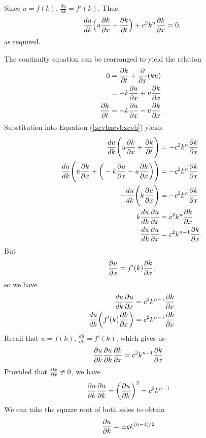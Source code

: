 Since $u=f(k)$, $\frac{du}{dk}=f'(k)$. Thus,
\begin{align*}
  \frac{du}{dk}\Big(u\kx+\kt\Big) + c^2k^n\frac{\partial k}{\partial x} =0,
\end{align*}
as required.
\item The continuity equation can be rearranged to yield the relation
\begin{align*}
  0&=\kt+\frac{\partial}{\partial x}(ku) \\
  &= +k\ux+u\kx \\
  \kt &= - k\ux-u\kx .
\end{align*}
Substitution into Equation (\ref{xcvbxcvbxcvb}) yields
\begin{align*}
  \frac{du}{dk} \Bigg(u\kx+\kt\Bigg)&=-c^2k^n\frac{\partial k}{\partial x} \\
  \frac{du}{dk} \Bigg(u\kx+\bigg( - k\ux-u\kx \bigg) \Bigg)&=-c^2k^n\frac{\partial k}{\partial x} \\  
  - \frac{du}{dk} \Bigg( k\ux  \Bigg)&=-c^2k^n\frac{\partial k}{\partial x} \\  
  k \frac{du}{dk} \ux &= c^2k^n\frac{\partial k}{\partial x} \\  
  \frac{du}{dk} \ux &= c^2k^{n-1}\frac{\partial k}{\partial x} .
\end{align*}
But 
\begin{align*}
   \ux =f'(k)\kx ,
\end{align*}
so we have
\begin{align*}
  \frac{du}{dk} \ux &= c^2k^{n-1}\kx \\  
  \frac{du}{dk}\bigg( f'(k)\kx \bigg) &= c^2k^{n-1}\frac{\partial k}{\partial x} \\  
\end{align*}
Recall that $u=f(k)$, $\frac{du}{dk}=f'(k)$, which gives us 
\begin{align*}
  \uk \uk \kx &= c^2k^{n-1}\kx 
\end{align*}
Provided that $\kx\ne0$, we have
\begin{align*}
  \uk \uk = \bigg(\uk\bigg)^2  &= c^2k^{n-1} 
\end{align*}
We can take the square root of both sides to obtain
\begin{align*}
  \uk &= \pm ck^{(n-1)/2} 
\end{align*}
\EEN



\EEN %

\newpage

